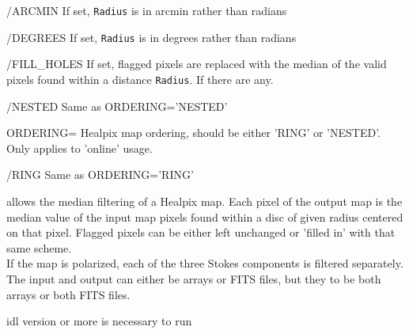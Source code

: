 \begin{keywords}
  \begin{kwlist}{} %
    \item[{/ARCMIN}]  If set, {\tt Radius} is in arcmin rather than radians

    \item[{/DEGREES}] If set, {\tt Radius} is in degrees rather than radians

	\item[{/FILL\_HOLES}]  If set, flagged pixels are replaced with the
	median of the valid pixels found within a distance {\tt Radius}. If
	there are any.

 	\item[{/NESTED}]  Same as ORDERING='NESTED'

 	\item[{ORDERING=}] 
	  Healpix map ordering, should be either 'RING' or 'NESTED'. Only
	  applies to 'online' usage.

 	\item[{/RING}]  Same as ORDERING='RING'

   \end{kwlist}
\end{keywords}

\begin{codedescription}
{\facname allows the median filtering of a Healpix map. Each pixel
  of the output map is the median value of the input  map pixels found within a disc of given
  radius centered on that pixel. Flagged
  pixels can be either left unchanged or 'filled in' with that same scheme. \\
If the map is polarized, each of the three Stokes components is filtered
  separately. \\
The input and output can either be arrays or FITS files, but they to be both
  arrays or both FITS files.}
\end{codedescription}



\begin{related}
  \begin{sulist}{} %
  \item[idl] version \idlversion or more is necessary to run \facname
  \end{sulist}
\end{related}


